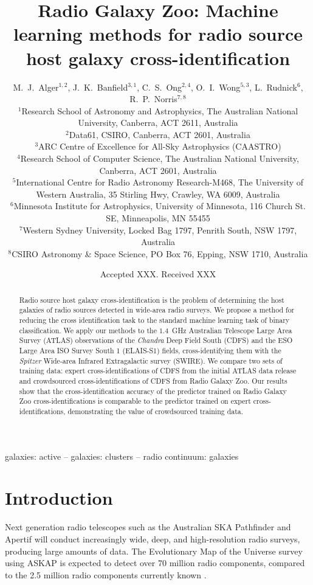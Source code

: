 \documentclass[fleqn,usenatbib,usedcolumn]{mnras}
\title[Machine learning methods for radio source cross-identification]{Radio Galaxy Zoo: Machine learning methods for radio source host galaxy cross-identification}
\author[Alger et al.]{
  M.~J.~Alger$^{1, 2}$,
  J.~K.~Banfield$^{3, 1}$,
  C.~S.~Ong$^{2, 4}$,
  O.~I.~Wong$^{5, 3}$,
  L.~Rudnick$^{6}$,
  R.~P.~Norris$^{7, 8}$
\\
$^{1}$Research School of Astronomy and Astrophysics, The Australian National University, Canberra, ACT 2611, Australia\\
$^{2}$Data61, CSIRO, Canberra, ACT 2601, Australia\\
$^{3}$ARC Centre of Excellence for All-Sky Astrophysics (CAASTRO)\\
$^{4}$Research School of Computer Science, The Australian National University, Canberra, ACT 2601, Australia\\
$^{5}$International Centre for Radio Astronomy Research-M468, The University of Western Australia, 35 Stirling Hwy, Crawley, WA 6009, Australia\\
$^{6}$Minnesota Institute for Astrophysics, University of Minnesota, 116 Church St. SE, Minneapolis, MN 55455\\
$^{7}$Western Sydney University, Locked Bag 1797, Penrith South, NSW 1797, Australia\\
$^{8}$CSIRO Astronomy \& Space Science, PO Box 76, Epping, NSW 1710, Australia
}
\date{Accepted XXX. Received XXX}
\begin{document}
\label{firstpage}
\pagerange{\pageref{firstpage}--\pageref{lastpage}}
\maketitle

\begin{abstract}
  Radio source host galaxy cross-identification is the problem of determining
  the host galaxies of radio sources detected in wide-area radio surveys. We
  propose a method for reducing the cross identification task to the standard
  machine learning task of binary classification. We apply our methods to the
  $1.4$~GHz Australian Telescope Large Area Survey (ATLAS) observations of the
  \emph{Chandra} Deep Field South (CDFS) and the ESO Large Area ISO Survey
  South 1 (ELAIS-S1) fields, cross-identifying them with the \emph{Spitzer}
  Wide-area Infrared Extragalactic survey (SWIRE). We compare two sets of
  training data: expert cross-identifications of CDFS from the initial ATLAS
  data release and crowdsourced cross-identifications of CDFS from Radio
  Galaxy Zoo. Our results show that the cross-identification accuracy of the
  predictor trained on Radio Galaxy Zoo cross-identifications is comparable to
  the predictor trained on expert cross-identifications, demonstrating the
  value of crowdsourced training data.
\end{abstract}

\begin{keywords}
galaxies: active -- galaxies: clusters -- radio continuum: galaxies
\end{keywords}


\section{Introduction}\label{introduction}

  Next generation radio telescopes such as the Australian SKA Pathfinder
  \citep[ASKAP;][]{johnston07} and Apertif \citep{verheijen08} will conduct
  increasingly wide, deep, and high-resolution radio surveys, producing large
  amounts of data. The Evolutionary Map of the Universe survey
  \citep[EMU;][]{norris11} using ASKAP is expected to detect over 70 million
  radio components, compared to the 2.5 million radio components currently
  known \citep{banfield15}.
\end{document}
